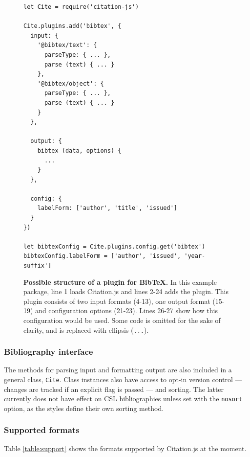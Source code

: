 \documentclass[fleqn,10pt,lineno]{wlpeerj} %
\begin{document}
\begin{figure}[bt!]
\begin{small}
\centering
\begin{verbatim}
let Cite = require('citation-js')

Cite.plugins.add('bibtex', {
  input: {
    '@bibtex/text': {
      parseType: { ... },
      parse (text) { ... }
    },
    '@bibtex/object': {
      parseType: { ... },
      parse (text) { ... }
    }
  },

  output: {
    bibtex (data, options) {
      ...
    }
  },

  config: {
    labelForm: ['author', 'title', 'issued']
  }
})

let bibtexConfig = Cite.plugins.config.get('bibtex')
bibtexConfig.labelForm = ['author', 'issued', 'year-suffix']
\end{verbatim}
\end{small}
\caption{\textbf{Possible structure of a plugin for BibTeX.}
In this example package, line 1 loads Citation.js and lines 2-24 adds the plugin. This plugin consists of two input formats (4-13), one output format (15-19) and configuration options (21-23). Lines 26-27 show how this configuration would be used. Some code is omitted for the sake of clarity, and is replaced with ellipsis (\texttt{...}).
}
\label{code:plugin}
\end{figure}

\subsubsection*{Bibliography interface}

The methods for parsing input and formatting output are also included in a general class, \texttt{Cite}. Class instances also have access to opt-in version control --- changes are tracked if an explicit flag is passed --- and sorting. The latter currently does not have effect on CSL bibliographies unless set with the \texttt{nosort} option, as the styles define their own sorting method.

\subsubsection*{Supported formats}

Table \ref{table:support} shows the formats supported by Citation.js at the moment.
\end{document}
